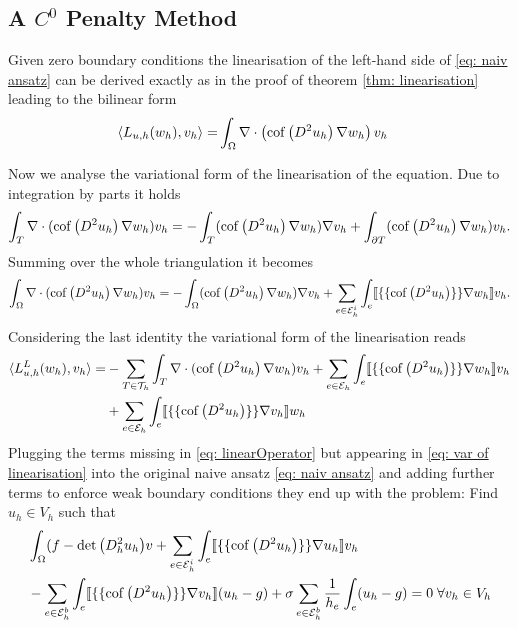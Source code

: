 \subsection{A $C^0$ Penalty Method }\label{sec: Brenner method}

Given zero boundary conditions the linearisation of the left-hand side of \eqref{eq: naiv ansatz} can be derived exactly as in the proof of theorem \ref{thm: linearisation} leading to the bilinear form
\begin{align}
\langle L_{u,h}(w_h),v_h\rangle =& \int_{\Omega} \nabla \cdot \left( \operatorname{cof} \left( D^2 u_h  \right) \nabla w_h \right) v_h
\label{eq: linearOperator}
\end{align}

Now we analyse the variational form of the linearisation of the \MA equation. Due to integration by parts it holds
\begin{align*}
  \int_T \nabla \cdot (\operatorname{cof} \left( D^2 u_h \right) \nabla w_h) v_h= -\int_T (\operatorname{cof} \left( D^2 u_h \right) \nabla w_h) \nabla v_h+ \int_{\partial T} (\operatorname{cof} \left( D^2 u_h \right) \nabla w_h) v_h.
\end{align*}
Summing over the whole triangulation it becomes
\begin{align*}
  \int_\Omega \nabla \cdot (\operatorname{cof} \left( D^2 u_h \right) \nabla w_h) v_h= -\int_\Omega (\operatorname{cof} \left( D^2 u_h \right) \nabla w_h) \nabla v_h+ \sum_{e \in \mathcal{E}_h^i} \int_{e} \llbracket \{\{\operatorname{cof} \left( D^2 u_h \right) \}\} \nabla w_h\rrbracket v_h.
\end{align*}
Considering the last identity the variational form of the linearisation reads
\begin{align}
	\langle L^L_{u,h}(w_h),v_h\rangle 
	    =&- \sum_{T \in \mathcal{T}_h}  \int_T \nabla \cdot (\operatorname{cof} \left( D^2 u_h \right) \nabla w_h) v_h
	    + \sum_{e \in \mathcal{E}_h} \int_{e} \llbracket \{\{\operatorname{cof} \left( D^2 u_h \right) \}\} \nabla w_h\rrbracket v_h \nonumber \\
	    &+ \sum_{e \in \mathcal{E}_h} \int_{e} \llbracket \{\{\operatorname{cof} \left( D^2 u_h \right) \}\} \nabla v_h\rrbracket w_h \label{eq: var of linearisation}
\end{align}
Plugging the terms missing in \eqref{eq: linearOperator} but appearing in \eqref{eq: var of linearisation} into the original naive ansatz \eqref{eq: naiv ansatz} and adding further terms to enforce weak boundary conditions they end up with the problem: Find $u_h \in V_h$ such that
\begin{align}
\begin{split}
	&\int_{\Omega} (f-\det{\left(D^2_h u_h\right)} v 
	+ \sum_{e \in \mathcal{E}_h^i} \int_{e} \llbracket \{\{\operatorname{cof} \left( D^2 u_h \right) \}\} \nabla u_h\rrbracket v_h \\
	&- \sum_{e \in \mathcal{E}_h^b} \int_{e} \llbracket \{\{\operatorname{cof} \left( D^2 u_h \right) \}\} \nabla v_h\rrbracket (u_h -g) 
	+ \sigma  \sum_{e \in \mathcal{E}_h^b} \frac 1 {h_e} \int_{e} (u_h -g)  = 0 \; \forall v_h \in V_h \label{eq: brenner method}
\end{split}
\end{align}

